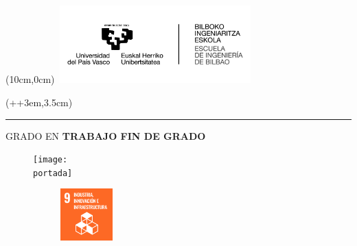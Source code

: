 
\begin{titlepage}
    \begin{textblock*}{\textwidth}(10cm,0cm)
        \includegraphics[width=7.5cm, height=3cm]{images/logos/Logo_EHU.jpg}
    \end{textblock*}
    
    
    \begin{textblock*}{\paperwidth}(\dimexpr\parindent+\oddsidemargin+3em\relax,3.5cm)
        \begin{minipage}{\dimexpr\linewidth-7.5cm\relax}
            \color{white}
            \noindent\rule{\linewidth}{0cm}
            \textsf{ {\large GRADO EN \grado}}
            \newline
            \newline \newline
            \textsf{\textbf{ {\Huge TRABAJO FIN DE GRADO }}}
        \end{minipage}
    \end{textblock*}
    
    \vspace*{3.5cm}
    \begin{minipage}{\linewidth}
        \setlength{\baselineskip}{1.7\baselineskip}
        \centering
        \textsf{ \textbf{ {\LARGE \titulo }}}
    \end{minipage}

    \vspace*{0.5cm}
    \begin{figure}[H]
        \centering
        \texttt{[image: \\portada]}
    \end{figure}

    \vspace*{1cm}
    \begin{figure}[h]
    \centering
        \begin{subfigure}[b]{0.135\textwidth}
            \includegraphics[width=2cm, height=2cm]{images/iconos_ods/09.png}
        \end{subfigure}
        

\end{figure}
\end{titlepage}

